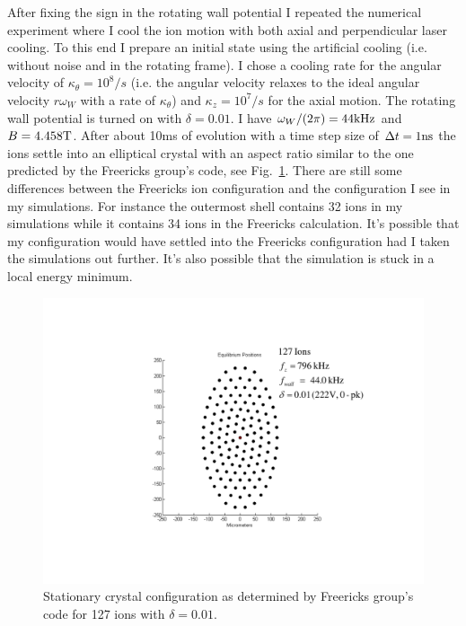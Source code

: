 \documentclass[
  aps,
  reprint,
  twoside,
  showpacs,
  amsmath,
  amssymb,
  floatfix
]{revtex4-1}
\begin{document}
After fixing the sign in the rotating wall potential I repeated the
numerical experiment where I cool the ion motion with both axial and
perpendicular laser cooling.  To this end I prepare an initial state
using the artificial cooling (i.e. without noise and in the rotating
    frame).  I chose a cooling rate for the angular velocity of
$\kappa_\theta=10^8/s$ (i.e. the angular velocity relaxes to the ideal
    angular velocity $r\omega_W$
    with a rate of $\kappa_\theta$) and $\kappa_z=10^7/s$ for the axial
motion.  The rotating wall potential is turned on with $\delta=0.01$. I
have $\omega_W/(2\pi)=44{\rm kHz}$ and $B=4.458{\rm T}$.  After about 10ms of
evolution with a time step size of $\Delta t =1{\rm ns}$ the ions
settle into an elliptical crystal with an aspect ratio similar to the one
predicted by the Freericks group's code, see
Fig.~\ref{fig:FreericksCodeCrystal}.  There are still some differences
between the Freericks ion configuration and the configuration I see in my
simulations.  For instance the outermost shell contains 32 ions in my
simulations while it contains 34 ions in the Freericks calculation.
It's possible that my configuration would have settled into the
Freericks configuration had I taken the simulations out further.
It's also possible that the simulation is stuck in a local energy minimum.

\begin{figure}
\center\includegraphics[width=0.95\columnwidth]{figures/Crystal_Configuration}
\caption{Stationary crystal configuration as determined by Freericks
  group's code for 127 ions with $\delta=0.01$.}
  \label{fig:FreericksCodeCrystal}
\end{figure}
\end{document}
